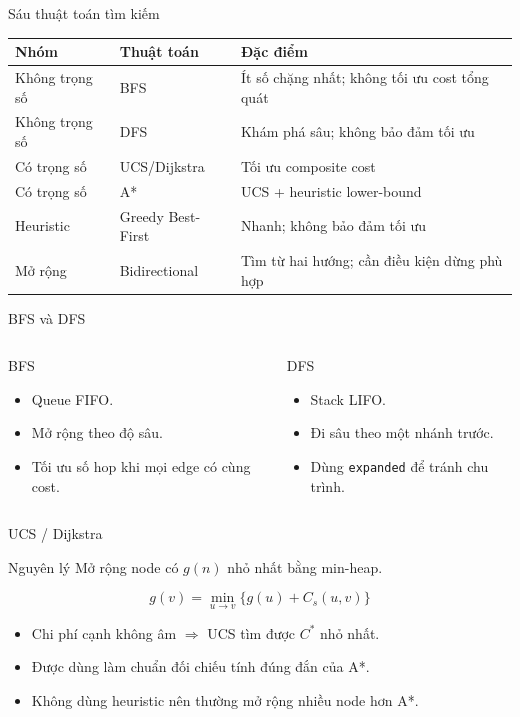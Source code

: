 \documentclass[aspectratio=169,11pt]{beamer}
\newcommand{\smallnote}[1]{\vspace{0.08cm}{\scriptsize\textcolor{muted}{#1}}}
\begin{document}
\begin{frame}{Sáu thuật toán tìm kiếm}
\begin{tabular}{lll}
\toprule
Nhóm & Thuật toán & Đặc điểm\\
\midrule
Không trọng số & BFS & Ít số chặng nhất; không tối ưu cost tổng quát\\
Không trọng số & DFS & Khám phá sâu; không bảo đảm tối ưu\\
Có trọng số & UCS/Dijkstra & Tối ưu composite cost\\
Có trọng số & A* & UCS + heuristic lower-bound\\
Heuristic & Greedy Best-First & Nhanh; không bảo đảm tối ưu\\
Mở rộng & Bidirectional & Tìm từ hai hướng; cần điều kiện dừng phù hợp\\
\bottomrule
\end{tabular}
\end{frame}

\begin{frame}{BFS và DFS}
\begin{columns}[T]
\begin{block}{BFS}
\begin{itemize}
  \item Queue FIFO.
  \item Mở rộng theo độ sâu.
  \item Tối ưu số hop khi mọi edge có cùng cost.
\end{itemize}
\end{block}
\begin{block}{DFS}
\begin{itemize}
  \item Stack LIFO.
  \item Đi sâu theo một nhánh trước.
  \item Dùng \texttt{expanded} để tránh chu trình.
\end{itemize}
\end{block}
\end{columns}
\vfill\centering\smallnote{Cả hai vẫn tuân thủ Graph contract và hard closure.}
\end{frame}

\begin{frame}{UCS / Dijkstra}
\begin{block}{Nguyên lý}
Mở rộng node có $g(n)$ nhỏ nhất bằng min-heap.
\end{block}
\begin{equation*}
g(v)=\min_{u\to v}\{g(u)+C_s(u,v)\}
\end{equation*}
\begin{itemize}
  \item Chi phí cạnh không âm $\Rightarrow$ UCS tìm được $C^*$ nhỏ nhất.
  \item Được dùng làm chuẩn đối chiếu tính đúng đắn của A*.
  \item Không dùng heuristic nên thường mở rộng nhiều node hơn A*.
\end{itemize}
\end{frame}
\end{document}
